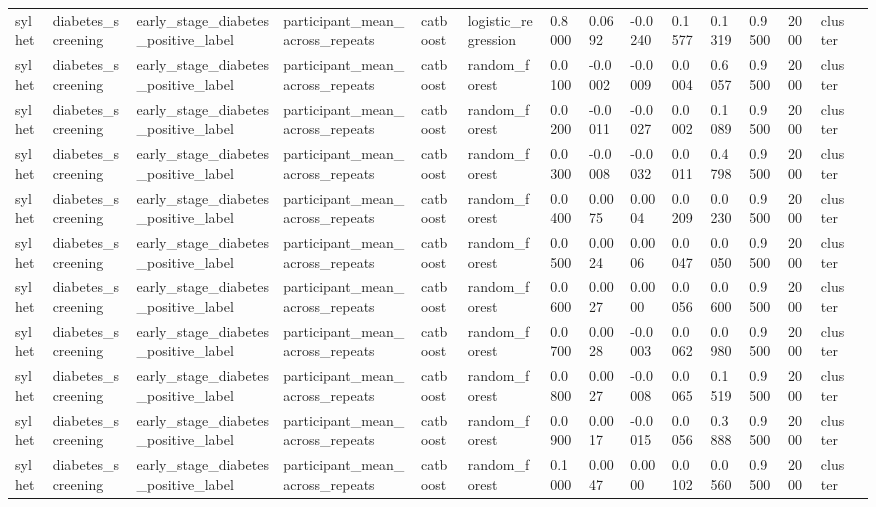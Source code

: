 \begin{tabular}{lllllllllllllll}
sylhet & diabetes\_screening & early\_stage\_diabetes\_positive\_label & participant\_mean\_across\_repeats & catboost & logistic\_regression & 0.8000 & 0.0692 & -0.0240 & 0.1577 & 0.1319 & 0.9500 & 2000 & cluster &  \\
sylhet & diabetes\_screening & early\_stage\_diabetes\_positive\_label & participant\_mean\_across\_repeats & catboost & random\_forest & 0.0100 & -0.0002 & -0.0009 & 0.0004 & 0.6057 & 0.9500 & 2000 & cluster &  \\
sylhet & diabetes\_screening & early\_stage\_diabetes\_positive\_label & participant\_mean\_across\_repeats & catboost & random\_forest & 0.0200 & -0.0011 & -0.0027 & 0.0002 & 0.1089 & 0.9500 & 2000 & cluster &  \\
sylhet & diabetes\_screening & early\_stage\_diabetes\_positive\_label & participant\_mean\_across\_repeats & catboost & random\_forest & 0.0300 & -0.0008 & -0.0032 & 0.0011 & 0.4798 & 0.9500 & 2000 & cluster &  \\
sylhet & diabetes\_screening & early\_stage\_diabetes\_positive\_label & participant\_mean\_across\_repeats & catboost & random\_forest & 0.0400 & 0.0075 & 0.0004 & 0.0209 & 0.0230 & 0.9500 & 2000 & cluster &  \\
sylhet & diabetes\_screening & early\_stage\_diabetes\_positive\_label & participant\_mean\_across\_repeats & catboost & random\_forest & 0.0500 & 0.0024 & 0.0006 & 0.0047 & 0.0050 & 0.9500 & 2000 & cluster &  \\
sylhet & diabetes\_screening & early\_stage\_diabetes\_positive\_label & participant\_mean\_across\_repeats & catboost & random\_forest & 0.0600 & 0.0027 & 0.0000 & 0.0056 & 0.0600 & 0.9500 & 2000 & cluster &  \\
sylhet & diabetes\_screening & early\_stage\_diabetes\_positive\_label & participant\_mean\_across\_repeats & catboost & random\_forest & 0.0700 & 0.0028 & -0.0003 & 0.0062 & 0.0980 & 0.9500 & 2000 & cluster &  \\
sylhet & diabetes\_screening & early\_stage\_diabetes\_positive\_label & participant\_mean\_across\_repeats & catboost & random\_forest & 0.0800 & 0.0027 & -0.0008 & 0.0065 & 0.1519 & 0.9500 & 2000 & cluster &  \\
sylhet & diabetes\_screening & early\_stage\_diabetes\_positive\_label & participant\_mean\_across\_repeats & catboost & random\_forest & 0.0900 & 0.0017 & -0.0015 & 0.0056 & 0.3888 & 0.9500 & 2000 & cluster &  \\
sylhet & diabetes\_screening & early\_stage\_diabetes\_positive\_label & participant\_mean\_across\_repeats & catboost & random\_forest & 0.1000 & 0.0047 & 0.0000 & 0.0102 & 0.0560 & 0.9500 & 2000 & cluster &  \\

\end{tabular}
